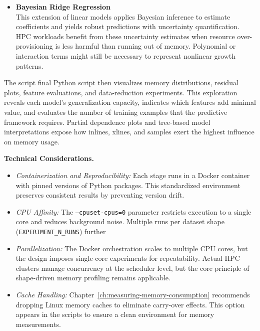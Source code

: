 \begin{itemize}
    \item \textbf{Bayesian Ridge Regression}~\cite{bishop2006pattern}\\
    This extension of linear models applies Bayesian inference to estimate coefficients and yields robust predictions with uncertainty quantification.
    HPC workloads benefit from these uncertainty estimates when resource over-provisioning is less harmful than running out of memory.
    Polynomial or interaction terms might still be necessary to represent nonlinear growth patterns. 
\end{itemize}

The script final Python script then visualizes memory distributions, residual plots, feature evaluations, and data-reduction experiments.
This exploration reveals each model’s generalization capacity, indicates which features add minimal value, and evaluates the number of training examples that the predictive framework requires.
Partial dependence plots and tree-based model interpretations expose how inlines, xlines, and samples exert the highest influence on memory usage.

\vspace{1em}
\noindent
\textbf{Technical Considerations.}
\begin{itemize}
    \item \emph{Containerization and Reproducibility:}
    Each stage runs in a Docker container with pinned versions of Python packages.
    This standardized environment preserves consistent results by preventing version drift.
    \item \emph{\ac{CPU} Affinity:}
    The \texttt{--cpuset-cpus=0} parameter restricts execution to a single core and reduces background noise.
    Multiple runs per dataset shape (\texttt{EXPERIMENT\_N\_RUNS}) further 
    \item \emph{Parallelization:}
    The Docker orchestration scales to multiple \ac{CPU} cores, but the design imposes single-core experiments for repeatability.
    Actual \ac{HPC} clusters manage concurrency at the scheduler level, but the core principle of shape-driven memory profiling remains applicable.
    \item \emph{Cache Handling:}
    Chapter~\ref{ch:measuring-memory-consumption} recommends dropping Linux memory caches to eliminate carry-over effects.
    This option appears in the scripts to ensure a clean environment for memory measurements.
\end{itemize}

